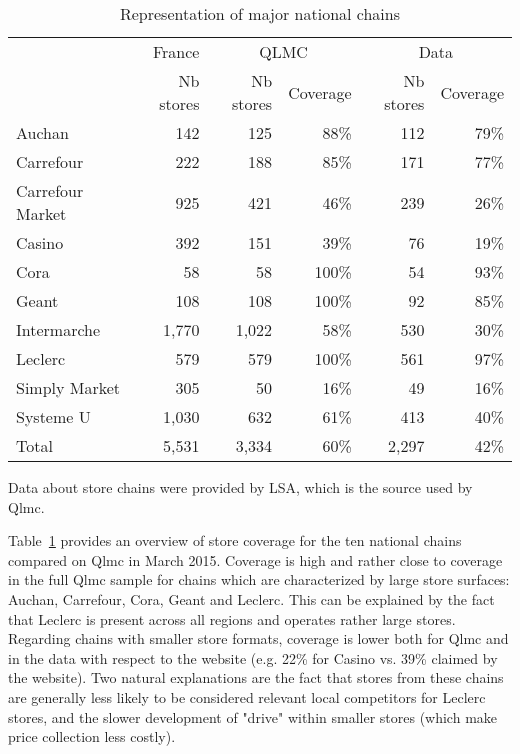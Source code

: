 \documentclass[english]{article}
\begin{document}
\begin{table}[H]
\begin{threeparttable}
\renewcommand{\arraystretch}{0.7}%
\caption{Representation of major national chains}
\label{tab:qlmc_chain_repr}
\small
\begin{tabular}{lr|rr|rr}
\toprule
          & France & \multicolumn{2}{c|}{QLMC} & \multicolumn{2}{c}{Data} \\
          & Nb stores & Nb stores & Coverage & Nb stores & Coverage \\
\midrule
    Auchan & 142   & 125   & 88\%  & 112   & 79\% \\
    Carrefour & 222   & 188   & 85\%  & 171   & 77\% \\
    Carrefour Market & 925   & 421   & 46\%  & 239   & 26\% \\
    Casino & 392   & 151   & 39\%  & 76    & 19\% \\
    Cora  & 58    & 58    & 100\% & 54    & 93\% \\
    Geant & 108   & 108   & 100\% & 92    & 85\% \\
    Intermarche & 1,770 & 1,022 & 58\%  & 530   & 30\% \\
    Leclerc & 579   & 579   & 100\% & 561   & 97\% \\
    Simply Market & 305   & 50    & 16\%  & 49    & 16\% \\
    Systeme U & 1,030 & 632   & 61\%  & 413   & 40\% \\
\midrule		
    Total & 5,531 & 3,334 & 60\%  & 2,297 & 42\% \\
\bottomrule
\bottomrule
\end{tabular}
\begin{tablenotes}
      \small
      \item Data about store chains were provided by LSA, which is the source used by Qlmc.
\end{tablenotes}
\end{threeparttable}
\end{table}

Table~\ref{tab:qlmc_chain_repr} provides an overview of store coverage for the ten national chains compared on Qlmc in March 2015. Coverage is high and rather close to coverage in the full Qlmc sample for chains which are characterized by large store surfaces: Auchan, Carrefour, Cora, Geant and Leclerc. This can be explained by the fact that Leclerc is present across all regions and operates rather large stores. Regarding chains with smaller store formats, coverage is lower both for Qlmc and in the data with respect to the website (e.g. 22\% for Casino vs. 39\% claimed by the website). Two natural explanations are the fact that stores from these chains are generally less likely to be considered relevant local competitors for Leclerc stores, and the slower development of "drive" within smaller stores (which make price collection less costly).
\end{document}
